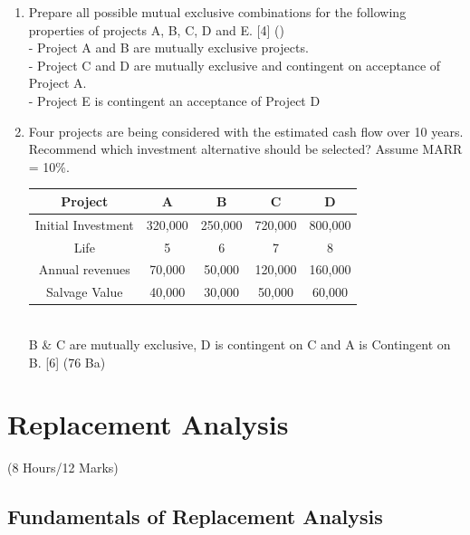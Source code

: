 \documentclass[12pt]{article}
\begin{document}
\begin{enumerate}[noitemsep, topsep = 0pt]
			\item Prepare all possible mutual exclusive combinations for the following properties of projects A, B, C, D and E. \hfill [4] ()\\
			- Project A and B are mutually exclusive projects.\\
			- Project C and D are mutually exclusive and contingent on acceptance of Project A.\\
			- Project E is contingent an acceptance of Project D 
			
			\item Four projects are being considered with the estimated cash flow over 10 years. Recommend which investment alternative should be selected? Assume MARR = 10\%. \\
			\begin{tabular}{|c|c|c|c|c|}
				\hline
				Project & A & B & C & D \\ \hline
				Initial Investment & 320,000 & 250,000 & 720,000 & 800,000 \\ \hline
				Life & 5 & 6 & 7 & 8 \\ \hline
				Annual revenues & 70,000 & 50,000 & 120,000 & 160,000 \\ \hline
				Salvage Value & 40,000 & 30,000 & 50,000 & 60,000 \\ \hline
			\end{tabular}\\
			B \& C are mutually exclusive, D is contingent on C and A is Contingent on B. \hfill [6] (76 Ba)
		\end{enumerate}

	\pagebreak
\section{Replacement Analysis}
	\begin{center}(8 Hours/12 Marks)\end{center}

	\subsection{Fundamentals of Replacement Analysis}
\end{document}
